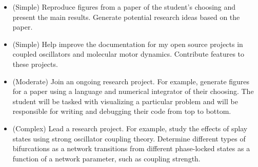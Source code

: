 \documentclass[a4paper,11pt]{article}
\begin{document}
	\begin{itemize}
		\item (Simple) Reproduce figures from a paper of the student's choosing and present the main results. Generate potential research ideas based on the paper.
		\item (Simple) Help improve the documentation for my open source projects in coupled oscillators and molecular motor dynamics. Contribute features to these projects.
		\item (Moderate) Join an ongoing research project. For example, generate figures for a paper using a language and numerical integrator of their choosing. The student will be tasked with visualizing a particular problem and will be responsible for writing and debugging their code from top to bottom.
		\item (Complex) Lead a research project. For example, study the effects of splay states using strong oscillator coupling theory. Determine different types of bifurcations as a network transitions from different phase-locked states as a function of a network parameter, such as coupling strength.
	\end{itemize}
	
	
	
\end{document}
